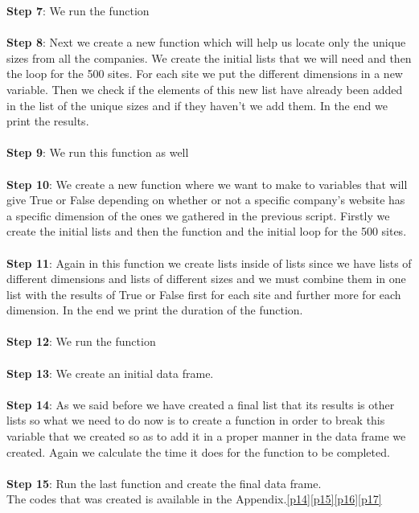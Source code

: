 \documentclass{book}
\begin{document}
\textbf{Step 7}: We run the function\\\\
\textbf{Step 8}: Next we create a new function which will help us locate only the unique sizes from all the companies. We create the initial lists that we will need and then the loop for the 500 sites. For each site we put the different dimensions in a new variable. Then we check if the elements of this new list have already been added in the list of the unique sizes and if they haven't we add them. In the end we print the results.\\\\
\textbf{Step 9}: We run this function as well\\\\
\textbf{Step 10}: We create a new function where we want to make to variables that will give True or False depending on whether or not a specific company's website has a specific dimension of the ones we gathered in the previous script. Firstly we create the initial lists and then the function and the initial loop for the 500 sites.\\\\
\textbf{Step 11}: Again in this function we create lists inside of lists since we have lists of different dimensions and lists of different sizes and we must combine them in one list with the results of True or False first for each site and further more for each dimension. In the end we print the duration of the function.\\\\
\textbf{Step 12}: We run the function\\\\
\textbf{Step 13}: We create an initial data frame.\\\\
\textbf{Step 14}: As we said before we have created a final list that its results is other lists so what we need to do now is to create a function in order to break this variable that we created so as to add it in a proper manner in the data frame we created. Again we calculate the time it does for the function to be completed.\\\\
\textbf{Step 15}: Run the last function and create the final data frame.\\
The codes that was created is available in the Appendix.\ref{p14}\ref{p15}\ref{p16}\ref{p17}                 
\end{document}
